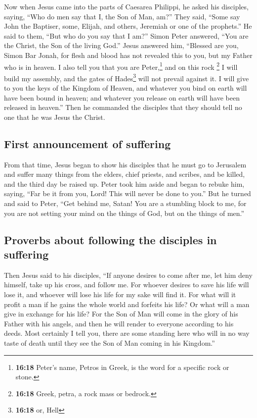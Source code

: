  Now when Jesus came into the parts of Caesarea Philippi,
he asked his disciples, saying, ``Who do men say that I, the Son of Man,
am?''  They said, ``Some say John the Baptiser, some,
Elijah, and others, Jeremiah or one of the prophets.'' 
He said to them, ``But who do you say that I am?''  Simon
Peter answered, ``You are the Christ, the Son of the living God.''
 Jesus answered him, ``Blessed are you, Simon Bar Jonah,
for flesh and blood has not revealed this to you, but my Father who is
in heaven.  I also tell you that you are
Peter,\footnote{\textbf{16:18} Peter's name, Petros in Greek, is the
  word for a specific rock or stone.} and on this rock \footnote{\textbf{16:18}
  Greek, petra, a rock mass or bedrock.} I will build my assembly, and
the gates of Hades\footnote{\textbf{16:18} or, Hell} will not prevail
against it.  I will give to you the keys of the Kingdom
of Heaven, and whatever you bind on earth will have been bound in
heaven; and whatever you release on earth will have been released in
heaven.''  Then he commanded the disciples that they
should tell no one that he was Jesus the Christ.

\hypertarget{first-announcement-of-suffering}{%
\subsection{First announcement of
suffering}\label{first-announcement-of-suffering}}

 From that time, Jesus began to show his disciples that
he must go to Jerusalem and suffer many things from the elders, chief
priests, and scribes, and be killed, and the third day be raised up.
 Peter took him aside and began to rebuke him, saying,
``Far be it from you, Lord! This will never be done to you.''
 But he turned and said to Peter, ``Get behind me, Satan!
You are a stumbling block to me, for you are not setting your mind on
the things of God, but on the things of men.''

\hypertarget{proverbs-about-following-the-disciples-in-suffering}{%
\subsection{Proverbs about following the disciples in
suffering}\label{proverbs-about-following-the-disciples-in-suffering}}

 Then Jesus said to his disciples, ``If anyone desires to
come after me, let him deny himself, take up his cross, and follow me.
 For whoever desires to save his life will lose it, and
whoever will lose his life for my sake will find it.  For
what will it profit a man if he gains the whole world and forfeits his
life? Or what will a man give in exchange for his life? 
For the Son of Man will come in the glory of his Father with his angels,
and then he will render to everyone according to his deeds.
 Most certainly I tell you, there are some standing here
who will in no way taste of death until they see the Son of Man coming
in his Kingdom.''

